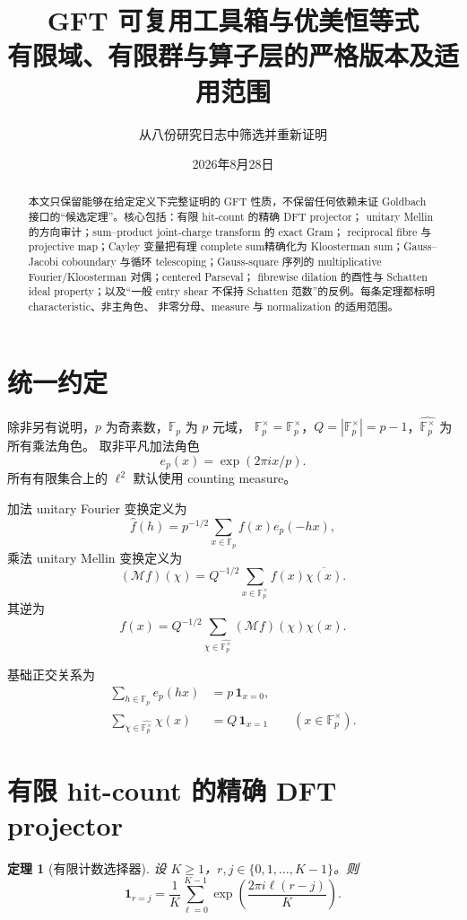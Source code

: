\documentclass[11pt,a4paper]{ctexart}
\title{GFT 可复用工具箱与优美恒等式\\
\large 有限域、有限群与算子层的严格版本及适用范围}
\author{从八份研究日志中筛选并重新证明}
\date{2026年8月28日}
\newtheorem{theorem}{定理}[section]
\theoremstyle{definition}
\newcommand{\F}{\mathbb F}
\newcommand{\G}{\F_p^\times}
\newcommand{\Gh}{\widehat{\G}}
\newcommand{\ep}{e_p}
\newcommand{\1}{\mathbf 1}
\begin{document}
\maketitle

\begin{abstract}
本文只保留能够在给定定义下完整证明的 GFT 性质，不保留任何依赖未证
Goldbach 接口的“候选定理”。核心包括：有限 hit-count 的精确 DFT projector；
unitary Mellin 的方向审计；sum--product joint-charge transform 的 exact Gram；
reciprocal fibre 与 projective map；Cayley 变量把有理 complete sum精确化为
Kloosterman sum；Gauss--Jacobi coboundary 与循环 telescoping；Gauss-square
序列的 multiplicative Fourier/Kloosterman 对偶；centered Parseval；
fibrewise dilation 的酉性与 Schatten ideal property；以及“一般 entry shear
不保持 Schatten 范数”的反例。每条定理都标明 characteristic、非主角色、
非零分母、measure 与 normalization 的适用范围。
\end{abstract}

\section{统一约定}

除非另有说明，$p$ 为奇素数，$\F_p$ 为 $p$ 元域，
$\G=\F_p^\times$，$Q=|\G|=p-1$，$\Gh$ 为所有乘法角色。
取非平凡加法角色
\[
\ep(x)=\exp(2\pi i x/p).
\]
所有有限集合上的 $\ell^2$ 默认使用 counting measure。

加法 unitary Fourier 变换定义为
\[
\widehat f(h)=p^{-1/2}\sum_{x\in\F_p}f(x)\ep(-hx),
\tag{1.1}
\]
乘法 unitary Mellin 变换定义为
\[
(\mathcal M f)(\chi)=Q^{-1/2}\sum_{x\in\G}f(x)\overline{\chi(x)}.
\tag{1.2}
\]
其逆为
\[
f(x)=Q^{-1/2}\sum_{\chi\in\Gh}(\mathcal Mf)(\chi)\chi(x).
\tag{1.3}
\]

基础正交关系为
\begin{align}
\sum_{h\in\F_p}\ep(hx)&=p\,\1_{x=0},                 \tag{1.4}\\
\sum_{\chi\in\Gh}\chi(x)&=Q\,\1_{x=1}\qquad(x\in\G). \tag{1.5}
\end{align}

\section{有限 hit-count 的精确 DFT projector}

\begin{theorem}[有限计数选择器]
设 $K\ge1$，$r,j\in\{0,1,\ldots,K-1\}$。则
\[
\boxed{
\1_{r=j}=\frac1K\sum_{\ell=0}^{K-1}
\exp\!\left(\frac{2\pi i\ell(r-j)}K\right).}
\tag{2.1}
\]
\end{theorem}
\end{document}
